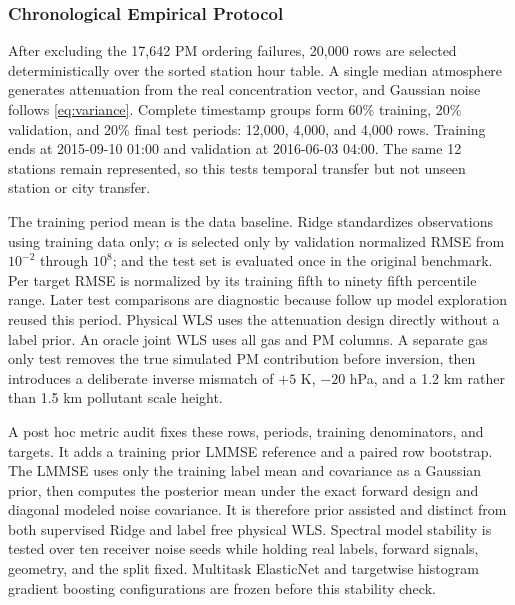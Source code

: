 \documentclass[conference]{IEEEtran}
\begin{document}
\subsubsection{Chronological Empirical Protocol}

After excluding the 17,642 PM ordering failures, 20,000 rows are selected deterministically over the sorted station hour table. A single median atmosphere generates attenuation from the real concentration vector, and Gaussian noise follows \eqref{eq:variance}. Complete timestamp groups form 60\% training, 20\% validation, and 20\% final test periods: 12,000, 4,000, and 4,000 rows. Training ends at 2015-09-10 01:00 and validation at 2016-06-03 04:00. The same 12 stations remain represented, so this tests temporal transfer but not unseen station or city transfer.

The training period mean is the data baseline. Ridge standardizes observations using training data only; $\alpha$ is selected only by validation normalized RMSE from $10^{-2}$ through $10^8$; and the test set is evaluated once in the original benchmark. Per target RMSE is normalized by its training fifth to ninety fifth percentile range. Later test comparisons are diagnostic because follow up model exploration reused this period. Physical WLS uses the attenuation design directly without a label prior. An oracle joint WLS uses all gas and PM columns. A separate gas only test removes the true simulated PM contribution before inversion, then introduces a deliberate inverse mismatch of $+5$ K, $-20$ hPa, and a 1.2 km rather than 1.5 km pollutant scale height.

A post hoc metric audit fixes these rows, periods, training denominators, and targets. It adds a training prior LMMSE reference and a paired row bootstrap. The LMMSE uses only the training label mean and covariance as a Gaussian prior, then computes the posterior mean under the exact forward design and diagonal modeled noise covariance. It is therefore prior assisted and distinct from both supervised Ridge and label free physical WLS. Spectral model stability is tested over ten receiver noise seeds while holding real labels, forward signals, geometry, and the split fixed. Multitask ElasticNet and targetwise histogram gradient boosting configurations are frozen before this stability check.
\end{document}
